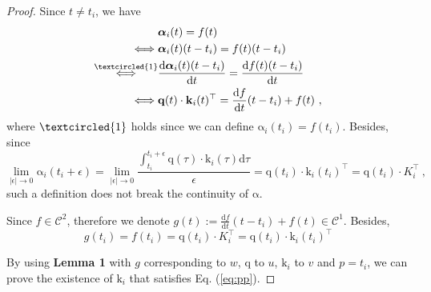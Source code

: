 \begin{proof}
Since $t \neq t_i$, we have
\begin{equation}
\begin{gathered}
\begin{aligned}
& \boldsymbol{\mathrm{\alpha}}_i(t) = f(t) \\
 \iff & \boldsymbol{\mathrm{\alpha}}_i(t) (t - t_i) = f(t) (t - t_i) \\
 \stackrel{\textcircled{\tiny{1}}}{\iff} & \frac{\text{d} \boldsymbol{\mathrm{\alpha}}_i(t) (t - t_i)}{\text{d} t} = \frac{\text{d} f(t) (t - t_i)}{\text{d} t} \\ 
 \iff & \boldsymbol{\mathrm{q}}(t) \cdot  \boldsymbol{\mathrm{k}}_i(t)^\top = \frac{\text{d} f}{\text{d} t}(t - t_i) + f(t) ~, \\
\end{aligned}
\end{gathered}
\label{eq:pp}
\end{equation}
where $\textcircled{\tiny{1}}$ holds since we can define $\boldsymbol{\mathrm{\alpha}}_i(t_i)=f(t_i)$. Besides, since
\begin{equation}
\lim_{|\epsilon| \rightarrow 0} \boldsymbol{\mathrm{\alpha}}_i(t_i + \epsilon) = \lim_{|\epsilon| \rightarrow 0} \frac{\int_{t_i}^{t_i + \epsilon} \boldsymbol{\mathrm{q}}(\tau) \cdot \boldsymbol{\mathrm{k}}_i(\tau) \text{d} \tau}{\epsilon} = \boldsymbol{\mathrm{q}}(t_i) \cdot \boldsymbol{\mathrm{k}}_i(t_i)^\top = \boldsymbol{\mathrm{q}}(t_i) \cdot K_i^\top ~,
\end{equation}
such a definition does not break the continuity of $\boldsymbol{\mathrm{\alpha}}$.

Since $f \in \mathcal{C}^2$, therefore we denote $g(t) := \frac{\text{d} f}{\text{d} t}(t - t_i) + f(t) \in \mathcal{C}^1$. Besides, 
\begin{equation}
g(t_i) = f(t_i) = \boldsymbol{\mathrm{q}}(t_i)\cdot K_i^\top   =  \boldsymbol{\mathrm{q}}(t_i) \cdot \boldsymbol{\mathrm{k}}_i(t_i)^\top 
\end{equation}

By using \textbf{Lemma 1} with $g$ corresponding to $w$, $\boldsymbol{\mathrm{q}}$ to $u$, $\boldsymbol{\mathrm{k}}_i$ to $v$ and $p=t_i$, we can prove the existence of $\boldsymbol{\mathrm{k}}_i$ that satisfies Eq. (\ref{eq:pp}).
\end{proof}

